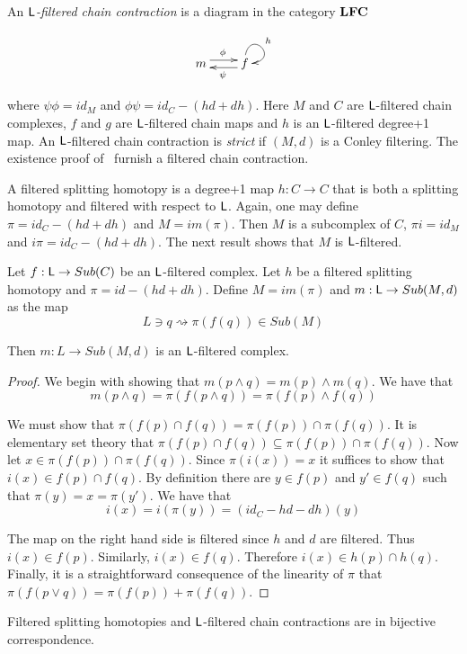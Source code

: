 An {\em ${\mathsf L}$-filtered chain contraction} is a diagram in the category ${\bf LFC}$ 

\[
\xymatrixrowsep{0.03in}
\xymatrixcolsep{0.3in}
\xymatrix{
m  \ar[r]<3pt>^{\phi} & \ar[l]<3pt>^{\psi} f \ar@(u,r)^{h}
}
\]

where $\psi\phi = id_M$ and $\phi\psi = id_C-(hd+dh)$.  Here  $M$ and $C$ are ${\mathsf L}$-filtered chain complexes, $f$ and $g$ are ${\mathsf L}$-filtered chain maps and $h$ is an ${\mathsf L}$-filtered degree+1 map.  An ${\mathsf L}$-filtered chain contraction is {\em strict} if $(M,d)$ is a Conley filtering.  The existence proof of~\cite{salamon}  furnish a filtered chain contraction.  

A filtered splitting homotopy is a degree+1 map $h:C\to C$ that is both a splitting homotopy and filtered with respect to ${\mathsf L}$.  Again, one may define $\pi=id_C-(hd+dh)$ and $M=im(\pi)$.  Then $M$ is a subcomplex of $C$, $\pi i = id_M$ and $i\pi = id_C-(hd+dh)$.  The next result shows that $M$ is ${\mathsf L}$-filtered. 

\begin{prop}
Let $f:{\mathsf L}\to Sub(C)$ be an ${\mathsf L}$-filtered complex.  Let $h$ be a filtered splitting homotopy and $\pi = id-(hd+dh)$.  Define $M=im(\pi)$ and $m:{\mathsf L}\to Sub(M,d)$ as the map $$L\ni q\rightsquigarrow  \pi(f(q))\in Sub(M)$$

Then $m:L\to Sub(M,d)$ is an ${\mathsf L}$-filtered complex.
\end{prop}
\begin{proof}
We begin with showing that $m(p \wedge q) = m(p)\wedge m(q)$.  We have that $$m(p\wedge q) = \pi(f(p\wedge q)) = \pi(f(p)\wedge f(q))$$

We must show that $\pi(f(p)\cap f(q)) = \pi(f(p))\cap \pi(f(q))$.  It is elementary set theory that $\pi(f(p)\cap f(q))\subseteq \pi(f(p))\cap \pi(f(q))$.  Now let $x\in \pi(f(p))\cap \pi(f(q))$.  Since $\pi(i(x))=x$ it suffices to show that $i(x)\in f(p)\cap f(q)$.  By definition there are $y\in f(p)$ and $y'\in f(q)$ such that $\pi(y) = x = \pi(y')$.  We have that $$i(x) = i(\pi(y)) = (id_C-hd - dh)(y)$$

The map on the right hand side is filtered since $h$ and $d$ are filtered.  Thus $i(x)\in f(p)$.  Similarly, $i(x)\in f(q)$.  Therefore $i(x)\in h(p)\cap h(q)$.  Finally, it is a straightforward consequence of the linearity of $\pi$ that $\pi(f(p\vee q)) = \pi(f(p))+\pi(f(q))$.


\end{proof}

\begin{cor}\label{cor:filt}
Filtered splitting homotopies and ${\mathsf L}$-filtered chain contractions are in bijective correspondence.
\end{cor}

